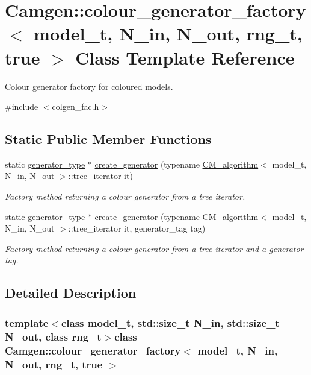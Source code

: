 \hypertarget{a00082}{}\section{Camgen\+:\+:colour\+\_\+generator\+\_\+factory$<$ model\+\_\+t, N\+\_\+in, N\+\_\+out, rng\+\_\+t, true $>$ Class Template Reference}
\label{a00082}


Colour generator factory for coloured models.  




{\ttfamily \#include $<$colgen\+\_\+fac.\+h$>$}

\subsection*{Static Public Member Functions}
\begin{DoxyCompactItemize}
\item 
static \hyperlink{a00077}{generator\+\_\+type} $\ast$ \hyperlink{a00082_ae5a52492e45d14ee623df29401b5c78f}{create\+\_\+generator} (typename \hyperlink{a00065}{C\+M\+\_\+algorithm}$<$ model\+\_\+t, N\+\_\+in, N\+\_\+out $>$\+::tree\+\_\+iterator it)
\begin{DoxyCompactList}\small\item\em Factory method returning a colour generator from a tree iterator. \end{DoxyCompactList}\item 
static \hyperlink{a00077}{generator\+\_\+type} $\ast$ \hyperlink{a00082_ac0dde2cf4ae4d210e1cfffbf78befac8}{create\+\_\+generator} (typename \hyperlink{a00065}{C\+M\+\_\+algorithm}$<$ model\+\_\+t, N\+\_\+in, N\+\_\+out $>$\+::tree\+\_\+iterator it, generator\+\_\+tag tag)
\begin{DoxyCompactList}\small\item\em Factory method returning a colour generator from a tree iterator and a generator tag. \end{DoxyCompactList}\end{DoxyCompactItemize}


\subsection{Detailed Description}
\subsubsection*{template$<$class model\+\_\+t, std\+::size\+\_\+t N\+\_\+in, std\+::size\+\_\+t N\+\_\+out, class rng\+\_\+t$>$class Camgen\+::colour\+\_\+generator\+\_\+factory$<$ model\+\_\+t, N\+\_\+in, N\+\_\+out, rng\+\_\+t, true $>$}

